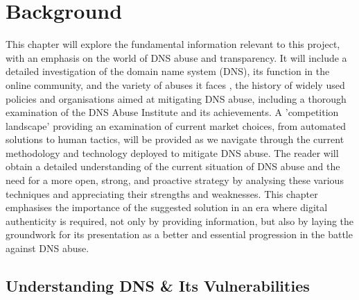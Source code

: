 \chapter{Background}
\label{Chapt2}


This chapter will explore the fundamental information relevant to this project, with an emphasis on the world of DNS abuse and transparency. It will include a detailed investigation of the domain name system (DNS), its function in the online community, and the variety of abuses it faces , the history of widely used policies and organisations aimed at mitigating DNS abuse, including a thorough examination of the DNS Abuse Institute and its achievements. A 'competition landscape' providing an examination of current market choices, from automated solutions to human tactics, will be provided as we navigate through the current methodology and technology deployed to mitigate DNS abuse. The reader will obtain a detailed understanding of the current situation of DNS abuse and the need for a more open, strong, and proactive strategy by analysing these various techniques and appreciating their strengths and weaknesses. This chapter emphasises the importance of the suggested solution in an era where digital authenticity is required, not only by providing information, but also by laying the groundwork for its presentation as a better and essential progression in the battle against DNS abuse.

\section{Understanding DNS \& Its Vulnerabilities}

